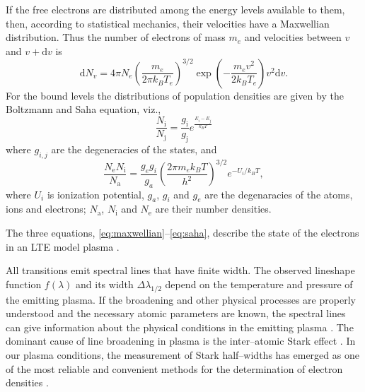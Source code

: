 \documentclass[../main.tex]{subfiles}
\begin{document}
If the free electrons are distributed among the energy levels available to them, then, according to statistical mechanics, their velocities have a Maxwellian distribution. Thus the number of electrons of mass $m_e$ and velocities between $v$ and $v+\mathrm{d}v$ is
\begin{equation}
\mathrm{d}N_v=4\pi N_e\left( \frac{m_e}{2\pi k_B T_e} \right)^{3/2} \exp\left(-\frac{m_e v^2}{2k_B T_e}\right) v^2 \mathrm{d}v.
    \label{eq:maxwellian}
\end{equation}
For the bound levels the distributions of population densities are given by the Boltzmann and Saha equation, viz.,
\begin{equation}
		\frac{N_\text{i}}{N_\text{j}}=\frac{g_\text{i}}{g_\text{j}}e^{\frac{E_i-E_j}{k_B T}}
		\label{eq:boltzmann}
\end{equation}
where $g_{i,j}$ are the degeneracies of the states, and
\begin{equation}
		\frac{N_\text{e} N_\text{i}}{N_\text{a}}=\frac{g_e g_i}{g_a} \left(\frac{2 \pi m_e k_B T}{h^2}\right)^{3/2}e^{-U_i/k_B T},
		\label{eq:saha}
\end{equation}
where $U_i$ is ionization potential, $g_a$, $g_i$ and $g_e$ are the degenaracies of the atoms, ions and electrons; $N_\text{a}$, $N_\text{i}$ and $N_\text{e}$ are their number densities.

The three equations, \ref{eq:maxwellian}--\ref{eq:saha}, describe the state of the electrons in an LTE model plasma \cite{McWhirter1965PlasmaTechniques}.


All transitions emit spectral lines that have finite width. The observed lineshape function $f(\lambda)$ and its width $\Delta \lambda_{1/2}$ depend on the temperature and pressure of the emitting plasma. If the broadening and other physical processes are properly understood and the necessary atomic parameters are known, the spectral lines can give information about the physical conditions in the emitting plasma \cite{Thorne1988Spectrophysics}. The dominant cause of line broadening in plasma is the inter--atomic Stark effect \cite{Wiese1965PlasmaTechniques}. In our plasma conditions, the measurement of Stark half--widths has emerged as one of the most reliable and convenient methods for the determination of electron densities \cite{Wiese1965PlasmaTechniques}.
\end{document}
